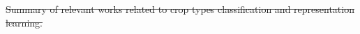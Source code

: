 \documentclass[journal,article,submit,pdftex,moreauthors]{Definitions/mdpi}
\providecommand{\DIFdel}[1]{{\protect\color{red}\sout{#1}}}                      %
\providecommand{\DIFdelbegin}{} %
\providecommand{\DIFdelFL}[1]{\DIFdel{#1}} %
\begin{document}
\DIFdelbegin %
{%
\DIFdelFL{Summary of relevant works related to crop types classification and representation learning.}}
\end{document}
